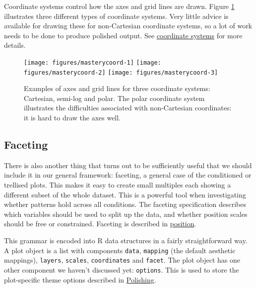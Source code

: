 Coordinate systems control how the axes and grid lines are drawn. Figure
\ref{fig:coord} illustrates three different types of coordinate systems.
Very little advice is available for drawing these for non-Cartesian
coordinate systems, so a lot of work needs to be done to produce
polished output. See \hyperref[sec:coord]{coordinate systems} for more
details.

\begin{figure}

{\centering \texttt{[image: figures/masterycoord-1]} \texttt{[image: figures/masterycoord-2]} \texttt{[image: figures/masterycoord-3]} 

}

\caption{Examples of axes and grid lines for three coordinate systems: Cartesian, semi-log and polar. The polar coordinate system illustrates the difficulties associated with non-Cartesian coordinates: it is hard to draw the axes well.\label{fig:coord}}
\end{figure}

\subsection{Faceting}\label{sub:intro-faceting}

There is also another thing that turns out to be sufficiently useful
that we should include it in our general framework: faceting, a general
case of the conditioned or trellised plots. This makes it easy to create
small multiples each showing a different subset of the whole dataset.
This is a powerful tool when investigating whether patterns hold across
all conditions. The faceting specification describes which variables
should be used to split up the data, and whether position scales should
be free or constrained. Faceting is described in
\hyperref[cha:position]{position}.


This grammar is encoded into R data structures in a fairly
straightforward way. A plot object is a list with components
\texttt{data}, \texttt{mapping} (the default aesthetic mappings),
\texttt{layers}, \texttt{scales}, \texttt{coordinates} and
\texttt{facet}. The plot object has one other component we haven't
discussed yet: \texttt{options}. This is used to store the plot-specific
theme options described in \hyperref[cha:polishing]{Polishing}.

